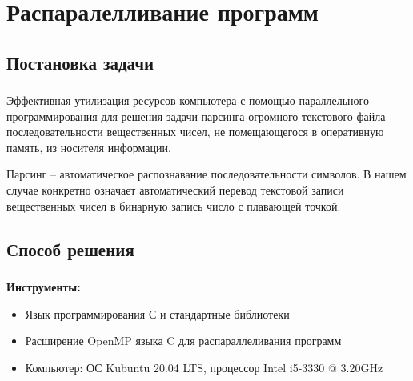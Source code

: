 
\section{Распаралелливание программ}


\subsection{Постановка задачи}
\begin{frame}
\frametitle{\insertsection}
\framesubtitle{\insertsubsection}

Эффективная утилизация ресурсов компьютера с помощью параллельного программирования
для решения задачи парсинга огромного текстового файла последовательности вещественных чисел,
не помещающегося в оперативную память, из носителя информации.

Парсинг -- автоматическое распознавание последовательности символов.
В нашем случае конкретно означает автоматический перевод текстовой записи вещественных чисел
в бинарную запись число с плавающей точкой.
\end{frame}


\subsection{Способ решения}


\begin{frame}
\frametitle{\insertsection}
\framesubtitle{\insertsubsection}

\textbf{Инструменты:}
\begin{itemize}
    \item Язык программирования С и стандартные библиотеки
    \item Расширение OpenMP языка C для распараллеливания программ 
    \item Компьютер: ОС Kubuntu 20.04 LTS, процессор  Intel i5-3330 @ 3.20GHz
\end{itemize}
\end{frame}


